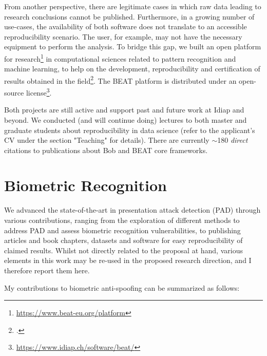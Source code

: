 \documentclass[a4paper,10pt,onecolumn]{article}
\begin{document}
From another perspective, there are legitimate cases in which raw data leading
to research conclusions cannot be published.  Furthermore, in a growing number
of use-cases, the availability of both software does not translate to an
accessible reproducibility scenario.  The user, for example, may not have the
necessary equipment to perform the analysis.  To bridge this gap, we built an
open platform for research\footnote{\url{https://www.beat-eu.org/platform}} in
computational sciences related to pattern recognition and machine learning, to
help on the development, reproducibility and certification of results obtained
in the field\footcite{icml-2017-1}.  The BEAT platform is distributed under an
open-source license\footnote{\url{https://www.idiap.ch/software/beat/}}.

Both projects are still active and support past and future work at Idiap and
beyond.  We conducted (and will continue doing) lectures to both master and
graduate students about reproducibility in data science (refer to the
applicant's CV under the section "Teaching" for details).  There are currently
$\sim$180 \textit{direct} citations to publications about Bob and BEAT core
frameworks.

\section{Biometric Recognition}

We advanced the state-of-the-art in presentation attack detection (PAD) through
various contributions, ranging from the exploration of different methods to
address PAD and assess biometric recognition vulnerabilities, to publishing
articles and book chapters, datasets and software for easy reproducibility of
claimed results.  Whilst not directly related to the proposal at hand, various
elements in this work may be re-used in the proposed research direction, and I
therefore report them here.

My contributions to biometric anti-spoofing can be summarized as follows:
\end{document}
